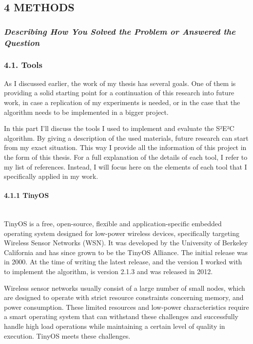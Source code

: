 \subsection{4 METHODS}\label{methods}

\subsubsection{\emph{Describing How You Solved the Problem or Answered
the
Question}}\label{describing-how-you-solved-the-problem-or-answered-the-question}

\subsubsection{4.1. Tools}\label{tools}

As I discussed earlier, the work of my thesis has several goals. One of
them is providing a solid starting point for a continuation of this
research into future work, in case a replication of my experiments is
needed, or in the case that the algorithm needs to be implemented in a
bigger project.

In this part I'll discuss the tools I used to implement and evaluate the
S²E²C algorithm. By giving a description of the used materials, future
research can start from my exact situation. This way I provide all the
information of this project in the form of this thesis. For a full
explanation of the details of each tool, I refer to my list of
references. Instead, I will focus here on the elements of each tool that
I specifically applied in my work.

\paragraph{4.1.1 TinyOS\\\\}\label{tinyos}

TinyOS is a free, open-source, flexible and application-specific
embedded operating system designed for low-power wireless devices,
specifically targeting Wireless Sensor Networks (WSN). It was developed
by the University of Berkeley California\cite{levis2005tinyos} and has
since grown to be the TinyOS Alliance. The initial release was in 2000.
At the time of writing the latest release, and the version I worked with
to implement the algorithm, is version 2.1.3 and was released in 2012.

Wireless sensor networks usually consist of a large number of small
nodes, which are designed to operate with strict resource constraints
concerning memory, and power consumption.\cite{akyildiz2002survey} These
limited resources and low-power characteristics require a smart
operating system that can withstand these challenges and successfully
handle high load operations while maintaining a certain level of quality
in execution. TinyOS meets these challenges.

